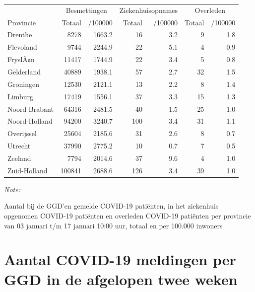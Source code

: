 \documentclass[
  english,
  man,floatsintext]{apa6}
\begin{document}
\begin{table}
\centering
\begin{threeparttable}
\begin{tabular}{lrrrrrr}
\toprule
\multicolumn{1}{c}{ } & \multicolumn{2}{c}{Besmettingen} & \multicolumn{2}{c}{Ziekenhuisopnames} & \multicolumn{2}{c}{Overleden} \\
\cmidrule(l{3pt}r{3pt}){2-3} \cmidrule(l{3pt}r{3pt}){4-5} \cmidrule(l{3pt}r{3pt}){6-7}
Provincie & Totaal & /100000 & Totaal & /100000 & Totaal & /100000\\
\midrule
Drenthe & 8278 & 1663.2 & 16 & 3.2 & 9 & 1.8\\
Flevoland & 9744 & 2244.9 & 22 & 5.1 & 4 & 0.9\\
FryslÃ¢n & 11417 & 1744.9 & 22 & 3.4 & 5 & 0.8\\
Gelderland & 40889 & 1938.1 & 57 & 2.7 & 32 & 1.5\\
Groningen & 12530 & 2121.1 & 13 & 2.2 & 8 & 1.4\\
Limburg & 17419 & 1556.1 & 37 & 3.3 & 15 & 1.3\\
Noord-Brabant & 64316 & 2481.5 & 40 & 1.5 & 25 & 1.0\\
Noord-Holland & 94200 & 3240.7 & 100 & 3.4 & 31 & 1.1\\
Overijssel & 25604 & 2185.6 & 31 & 2.6 & 8 & 0.7\\
Utrecht & 37990 & 2775.2 & 10 & 0.7 & 7 & 0.5\\
Zeeland & 7794 & 2014.6 & 37 & 9.6 & 4 & 1.0\\
Zuid-Holland & 100841 & 2688.6 & 126 & 3.4 & 39 & 1.0\\
\bottomrule
\end{tabular}
\begin{tablenotes}
\item \textit{Note: } 
\item Aantal bij de GGD’en gemelde COVID-19 patiënten, in het ziekenhuis opgenomen COVID-19 patiënten en overleden COVID-19 patiënten per provincie van 03 januari t/m 17 januari 10:00 uur, totaal en per 100.000 inwoners
\end{tablenotes}
\end{threeparttable}
\end{table}

\newpage

\hypertarget{aantal-covid-19-meldingen-per-ggd-in-de-afgelopen-twee-weken}{%
\section{Aantal COVID-19 meldingen per GGD in de afgelopen twee weken}\label{aantal-covid-19-meldingen-per-ggd-in-de-afgelopen-twee-weken}}
\end{document}
